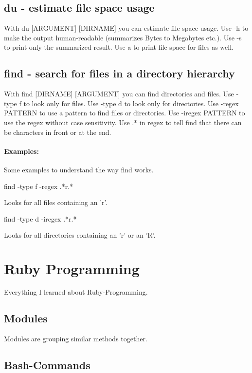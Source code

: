 \documentclass[10pt,a4paper]{scrartcl}
\begin{document}
\subsection{du - estimate file space usage}
With du [ARGUMENT] [DIRNAME] you can estimate file space usage. Use -h to make the output human-readable (summarizes Bytes to Megabytes etc.). Use -s to print only the summarized result. Use a to print file space for files as well. 

\subsection{find - search for files in a directory hierarchy}
With find [DIRNAME] [ARGUMENT] you can find directories and files. Use -type f to look only for files. Use -type d to look only for directories. Use -regex PATTERN to use a pattern to find files or directories. Use -iregex PATTERN to use the regex without case sensitivity. Use .* in regex to tell find that there can be characters in front or at the end. 

\paragraph{Examples:} Some examples to understand the way find works.
\begin{terminalcode}
find -type f -regex .*r.*
\end{terminalcode}
Looks for all files containing an 'r'.

\begin{terminalcode}
find -type d -iregex .*r.*
\end{terminalcode}
Looks for all directories containing an 'r' or an 'R'.
\section{Ruby Programming}

Everything I learned about Ruby-Programming.

\subsection{Modules}

Modules are grouping similar methods together.

\subsection{Bash-Commands}
\end{document}

